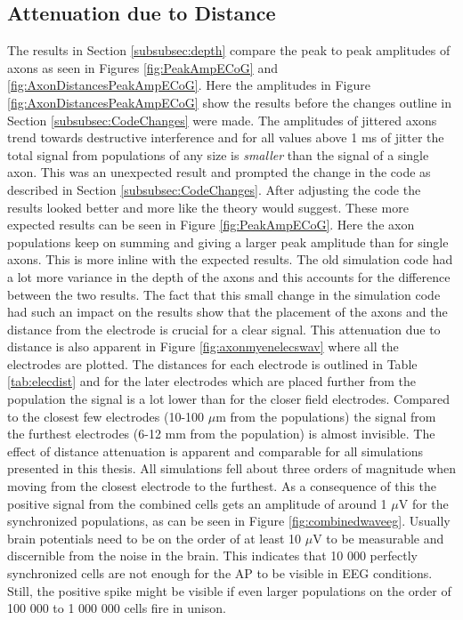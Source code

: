 \documentclass[final, a4paper,masters,en,listoffigures,listoftables,norwegiandates]{NMBU}
\begin{document}
\subsection{Attenuation due to Distance}
The results in Section \ref{subsubsec:depth} compare the peak to peak amplitudes of axons as seen in Figures \ref{fig:PeakAmpECoG} and \ref{fig:AxonDistancesPeakAmpECoG}. Here the amplitudes in Figure \ref{fig:AxonDistancesPeakAmpECoG} show the results before the changes outline in Section \ref{subsubsec:CodeChanges} were made. The amplitudes of jittered axons trend towards destructive interference and for all values above 1 ms of jitter the total signal from populations of any size is \emph{smaller} than the signal of a single axon. This was an unexpected result and prompted the change in the code as described in Section \ref{subsubsec:CodeChanges}. After adjusting the code the results looked better and more like the theory would suggest. These more expected results can be seen in Figure \ref{fig:PeakAmpECoG}. Here the axon populations keep on summing and giving a larger peak amplitude than for single axons. This is more inline with the expected results. The old simulation code had a lot more variance in the depth of the axons and this accounts for the difference between the two results. The fact that this small change in the simulation code had such an impact on the results show that the placement of the axons and the distance from the electrode is crucial for a clear signal. 
\newline This attenuation due to distance is also apparent in Figure \ref{fig:axonmyenelecswav} where all the electrodes are plotted. The distances for each electrode is outlined in Table \ref{tab:elecdist} and for the later electrodes which are placed further from the population the signal is a lot lower than for the closer field electrodes. Compared to the closest few electrodes (10-100 $\mu$m from the populations) the signal from the furthest electrodes (6-12 mm from the population) is almost invisible. 
The effect of distance attenuation is apparent and comparable for all simulations presented in this thesis. All simulations fell about three orders of magnitude when moving from the closest electrode to the furthest. 
\newline As a consequence of this the positive signal from the combined cells gets an amplitude of around 1 $\mu$V for the synchronized populations, as can be seen in Figure \ref{fig:combinedwaveeg}. Usually brain potentials need to be on the order of at least 10 $\mu$V to be measurable and discernible from the noise in the brain. This indicates that 10 000 perfectly synchronized cells are not enough for the AP to be visible in EEG conditions. Still, the positive spike might be visible if even larger populations on the order of 100 000 to 1 000 000 cells fire in unison. 
\end{document}
